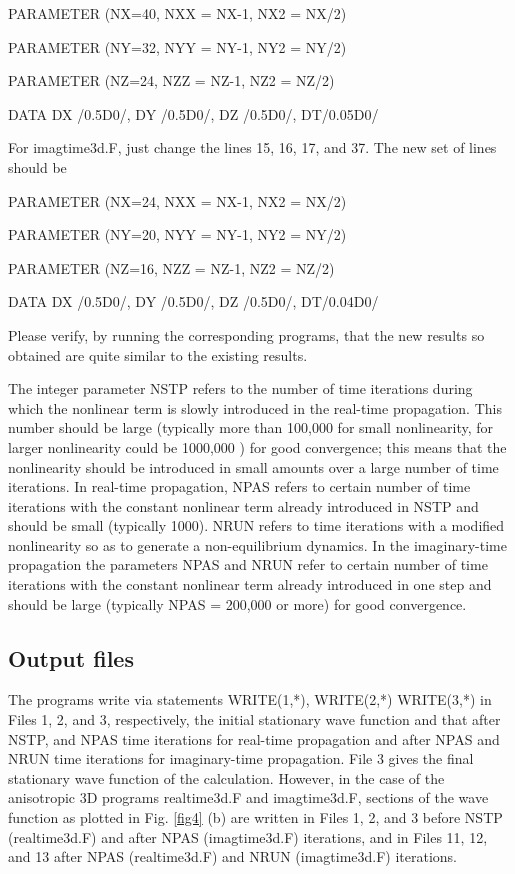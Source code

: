\documentclass[onecolumn]{elsart3p}
\begin{document}
      PARAMETER (NX=40, NXX = NX-1, NX2 = NX/2)

      PARAMETER (NY=32, NYY = NY-1, NY2 = NY/2)

      PARAMETER (NZ=24, NZZ = NZ-1, NZ2 = NZ/2)

      DATA DX /0.5D0/, DY /0.5D0/,  DZ /0.5D0/, DT/0.05D0/

For imagtime3d.F, just change the lines  15, 16, 17, and 37.  The new
set of lines should be

      PARAMETER (NX=24, NXX = NX-1, NX2 = NX/2)

      PARAMETER (NY=20, NYY = NY-1, NY2 = NY/2)

      PARAMETER (NZ=16, NZZ = NZ-1, NZ2 = NZ/2)

      DATA DX /0.5D0/, DY /0.5D0/,  DZ /0.5D0/, DT/0.04D0/

Please verify, by running the corresponding programs,  that the new 
results so obtained are quite similar to the 
existing results. 


The integer parameter NSTP refers to the number of time iterations during which
the nonlinear term is slowly introduced in the real-time propagation. This
number should be large (typically more than 100,000 for small nonlinearity, for
larger nonlinearity could be 1000,000 ) for good convergence; this means that
the nonlinearity should be introduced in small amounts over a large number of
time iterations. In real-time propagation, NPAS refers to certain number of time
iterations with the constant nonlinear term already introduced in NSTP  and
should be small (typically 1000). NRUN refers to time iterations with a 
modified
nonlinearity so as to generate a non-equilibrium dynamics. In the imaginary-time
propagation the parameters NPAS and NRUN refer to certain number of time
iterations with the constant nonlinear term already introduced in one step and
should be large (typically NPAS = 200,000 or more) for good convergence.




\subsection{Output files}


The programs write via statements WRITE(1,*), WRITE(2,*) WRITE(3,*)  in Files 1,
2, and 3, respectively, the initial stationary wave function  and that after
NSTP, and NPAS time iterations for real-time propagation and after NPAS and NRUN
time iterations for imaginary-time propagation. File 3  gives the final
stationary wave function of the calculation. However, in the case of the
anisotropic 3D programs realtime3d.F and imagtime3d.F, sections of the wave
function as plotted in Fig. \ref{fig4} (b) are written in Files 1, 2, and 3
before  NSTP (realtime3d.F) and after NPAS  (imagtime3d.F) iterations, 
and in Files 11,
12, and 13 after NPAS (realtime3d.F) and NRUN  (imagtime3d.F) iterations.
\end{document}
